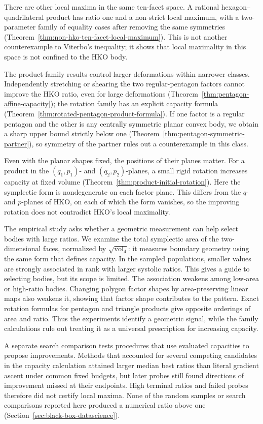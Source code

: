 There are other local maxima in the same ten-facet space. A rational
hexagon--quadrilateral product has ratio one and a non-strict local
maximum, with a two-parameter family of equality cases after removing the
same symmetries (Theorem~\ref{thm:non-hko-ten-facet-local-maximum}). This
is not another counterexample to Viterbo's inequality; it shows that local
maximality in this space is not confined to the HKO body.

The product-family results control larger deformations within narrower
classes. Independently stretching or shearing the two
regular-pentagon factors cannot improve the HKO ratio, even for large
deformations (Theorem~\ref{thm:pentagon-affine-capacity}); the rotation
family has an explicit capacity formula
(Theorem~\ref{thm:rotated-pentagon-product-formula}). If one factor is a
regular pentagon and the other is any centrally symmetric planar convex
body, we obtain a sharp upper bound strictly below one
(Theorem~\ref{thm:pentagon-symmetric-partner}), so symmetry of the partner
rules out a counterexample in this class.

Even with the planar shapes fixed, the positions of their planes matter.
For a product in the $(q_1,p_1)$- and $(q_2,p_2)$-planes, a small rigid
rotation increases capacity at fixed volume
(Theorem~\ref{thm:product-initial-rotation}). Here the symplectic form is
nondegenerate on each factor plane. This differs from the $q$- and
$p$-planes of HKO, on each of which the form vanishes, so the improving
rotation does not contradict HKO's local maximality.

The empirical study asks whether a geometric measurement can help select
bodies with large ratios. We examine the total symplectic area of the
two-dimensional faces, normalized by $\sqrt{\operatorname{vol}_4}$:
it measures boundary geometry using the same form that defines capacity.
In the sampled populations, smaller values are strongly associated in
rank with larger systolic ratios. This gives a guide to selecting bodies,
but its scope is limited. The association weakens among low-area or
high-ratio bodies. Changing polygon factor shapes by area-preserving
linear maps also weakens it, showing that factor shape contributes to the
pattern. Exact rotation formulas for pentagon and triangle products give
opposite orderings of area and ratio. Thus the experiments identify a
geometric signal, while the family calculations rule out treating it as
a universal prescription for increasing capacity.

A separate search comparison tests procedures that use evaluated
capacities to propose improvements. Methods that accounted for several
competing candidates in the capacity calculation attained larger median
best ratios than literal gradient ascent under common fixed budgets, but later
probes still found directions of improvement missed at their endpoints.
High terminal ratios and failed probes therefore did not certify local
maxima. None of the random samples or search comparisons reported here
produced a numerical ratio above one
(Section~\ref{sec:black-box-datascience}).

